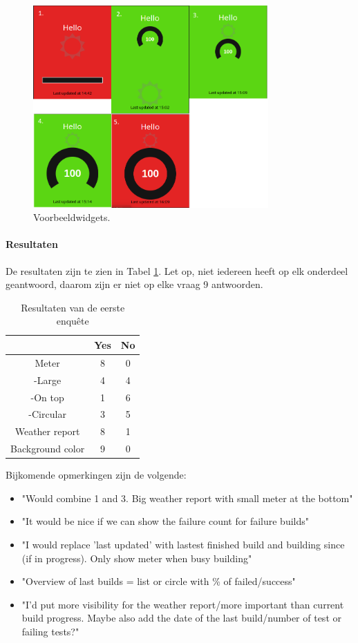 \documentclass[10pt,a4paper]{article}
\begin{document}
\begin{appendices}
\begin{figure}[ht!]
\centering
\includegraphics[width=90mm]{proposals.png}
\caption{Voorbeeldwidgets.} 
\label{proposals}
\end{figure} 

\paragraph{Resultaten}
De resultaten zijn te zien in Tabel \ref{results}. Let op, niet iedereen heeft op elk onderdeel geantwoord, daarom zijn er niet op elke vraag 9 antwoorden.

\begin{table}[h!]
\centering
\begin{tabular}{|c|c|c|}
\hline                         										
		 			&	Yes 		&	No		\\	\hline	\hline
Meter				&	8			&	0		\\	\hline
-Large				&	4			&	4		\\	\hline
-On top				&	1			&	6		\\	\hline	
-Circular			&	3			&	5		\\	\hline
Weather report		&	8			&	1		\\	\hline
Background color	&	9			&	0		\\	\hline
\end{tabular}
\caption{Resultaten van de eerste enqu\^ete}
\label{results}
\end{table}

Bijkomende opmerkingen zijn de volgende:
\begin{itemize}
\item "Would combine 1 and 3. Big weather report with small meter at the bottom"
\item "It would be nice if we can show the failure count for failure builds"
\item "I would replace 'last updated' with lastest finished build and building since (if in progress). Only show meter when busy building"
\item "Overview of last builds = list or circle with \% of failed/success"
\item "I'd put more visibility for the weather report/more important than current build progress. Maybe also add the date of the last build/number of test or failing tests?"
\end{itemize}

\end{appendices}
\end{document}
